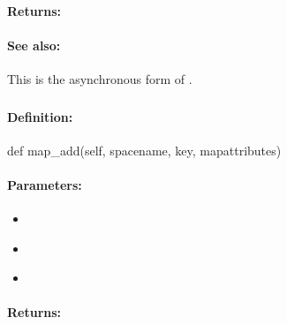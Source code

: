 \paragraph{Returns:}


\paragraph{See also:}  This is the asynchronous form of .

\pagebreak
\subsubsection{}
\label{api:python:map_add}


\paragraph{Definition:}
\begin{pythoncode}
def map_add(self, spacename, key, mapattributes)
\end{pythoncode}

\paragraph{Parameters:}
\begin{itemize}[noitemsep]
\item {}\\

\item {}\\

\item {}\\

\end{itemize}

\paragraph{Returns:}


\pagebreak
\subsubsection{}
\label{api:python:async_map_add}


